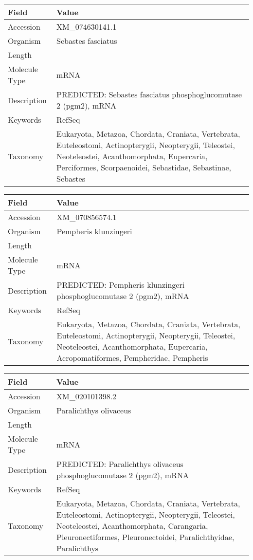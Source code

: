 \documentclass[10pt]{article}
\begin{document}
{\footnotesize
\begin{longtable}{>{\raggedright\arraybackslash}p{4.5cm} >{\raggedright\arraybackslash}p{11.5cm}}
\textbf{Field} & \textbf{Value} \\
\hline
Accession & XM\_074630141.1 \\
Organism & Sebastes fasciatus \\
Length & 2984 \\
Molecule Type & mRNA \\
Description & PREDICTED: Sebastes fasciatus phosphoglucomutase 2 (pgm2), mRNA \\
Keywords & RefSeq \\
Taxonomy & Eukaryota, Metazoa, Chordata, Craniata, Vertebrata, Euteleostomi, Actinopterygii, Neopterygii, Teleostei, Neoteleostei, Acanthomorphata, Eupercaria, Perciformes, Scorpaenoidei, Sebastidae, Sebastinae, Sebastes \\
\end{longtable}
}

{\footnotesize
\begin{longtable}{>{\raggedright\arraybackslash}p{4.5cm} >{\raggedright\arraybackslash}p{11.5cm}}
\textbf{Field} & \textbf{Value} \\
\hline
Accession & XM\_070856574.1 \\
Organism & Pempheris klunzingeri \\
Length & 2771 \\
Molecule Type & mRNA \\
Description & PREDICTED: Pempheris klunzingeri phosphoglucomutase 2 (pgm2), mRNA \\
Keywords & RefSeq \\
Taxonomy & Eukaryota, Metazoa, Chordata, Craniata, Vertebrata, Euteleostomi, Actinopterygii, Neopterygii, Teleostei, Neoteleostei, Acanthomorphata, Eupercaria, Acropomatiformes, Pempheridae, Pempheris \\
\end{longtable}
}

{\footnotesize
\begin{longtable}{>{\raggedright\arraybackslash}p{4.5cm} >{\raggedright\arraybackslash}p{11.5cm}}
\textbf{Field} & \textbf{Value} \\
\hline
Accession & XM\_020101398.2 \\
Organism & Paralichthys olivaceus \\
Length & 2801 \\
Molecule Type & mRNA \\
Description & PREDICTED: Paralichthys olivaceus phosphoglucomutase 2 (pgm2), mRNA \\
Keywords & RefSeq \\
Taxonomy & Eukaryota, Metazoa, Chordata, Craniata, Vertebrata, Euteleostomi, Actinopterygii, Neopterygii, Teleostei, Neoteleostei, Acanthomorphata, Carangaria, Pleuronectiformes, Pleuronectoidei, Paralichthyidae, Paralichthys \\
\end{longtable}
}
\end{document}
